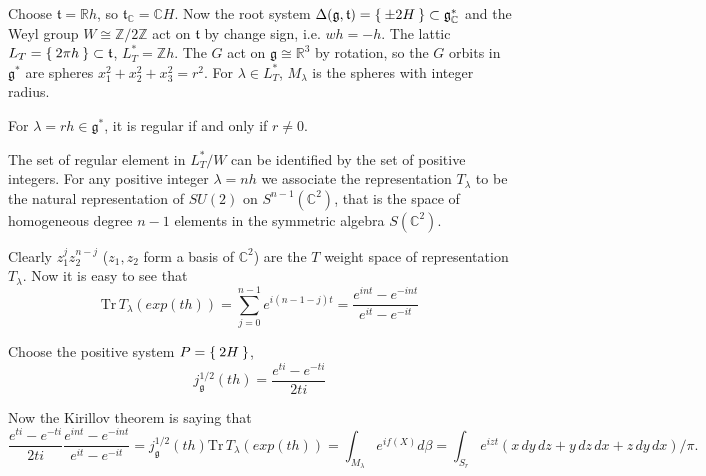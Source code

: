 \documentclass[11pt]{amsart}
\def\bC{{\mathbb{C}}}
\def\bR{{\mathbb{R}}}
\def\bZ{{\mathbb{Z}}}
\def\fgg{{\mathfrak{g}}}
\def\ftt{{\mathfrak{t}}}
\def\bZ{{\mathbb{Z}}}
\def\Tr{\mathrm{Tr}}
\begin{document}
Choose $\ftt = \bR h$, so $\ftt_\bC = \bC H$. 
Now the root system $\Delta(\fgg,\ftt) = \Set{\pm 2 H} \subset \fgg_\bC^* $
and the Weyl group $W\cong \bZ/2\bZ$ act on $\ftt$ by change sign, i.e. $wh = -h$. 
The lattic $L_T = \Set{2\pi h} \subset \ftt$, $L_T^* = \bZ h$.
The $G$ act on $\fgg\cong \bR^3$ by rotation, so the $G$ orbits in $\fgg^*$ 
are spheres $x_1^2+x_2^2+x_3^2=r^2$. For $\lambda \in L_T^*$, $M_\lambda$ is the
spheres with integer radius. 

For $\lambda = r h \in \fgg^*$, it is regular if and only if $r \neq 0$.

The set of regular element in $L_T^*/W$ can be identified by the set of positive 
integers. For any positive integer $\lambda = nh$ we associate the representation $T_\lambda$ to be the natural representation of $SU(2)$ on $S^{n-1}(\bC^2)$, that
is the space of homogeneous degree $n-1$ 
elements in the symmetric algebra $S(\bC^2)$. 

Clearly $z_1^{j}z_2^{n-j}$ ($z_1, z_2$ form a basis of $\bC^2$) 
are the $T$ weight space of representation $T_\lambda$.
Now it is easy to see that 
\[
\Tr\, T_\lambda(exp(th)) 
= \sum_{j=0}^{n-1}e^{i(n-1-j)t} = \frac{e^{int} - e^{-int}}{e^{it}-e^{-it}}
\]

Choose the positive system $P = \Set{2H}$, 
\[
j_\fgg^{1/2}(th) = \frac{e^{ti}-e^{-ti}}{2ti}
\]

Now the Kirillov theorem is saying that 
\[
\frac{e^{ti}-e^{-ti}}{2ti} \frac{e^{int} - e^{-int}}{e^{it}-e^{-it}}
=  j_\fgg^{1/2}(th)\Tr\, T_\lambda(exp(th)) 
= \int_{M_\lambda}e^{if(X)}d\beta
= \int_{S_r}e^{i zt} (x\,dy\,dz+y\,dz\,dx+z\,dy\,dx)/\pi.
\]



\end{document}
